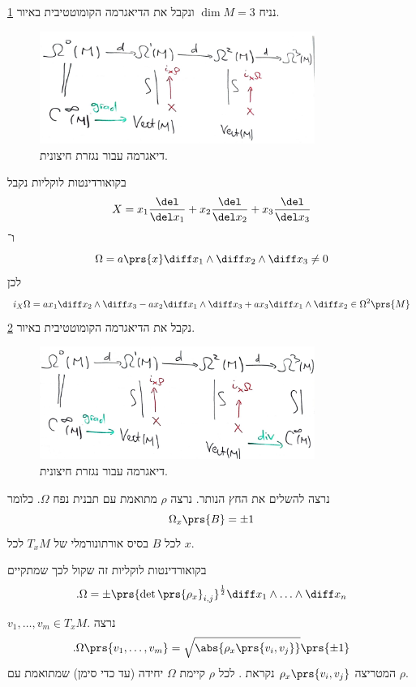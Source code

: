 \documentclass[a4paper,10pt,twoside,openany]{book}
\begin{document}
\begin{example}
נניח
$\dim M = 3$
ונקבל את הדיאגרמה הקומוטטיבית באיור
\ref{rot1}.

\begin{figure}[h!t]
\centering
\caption{דיאגרמה עבור נגזרת חיצונית.}
\label{rot1}
\includegraphics[width=0.8\textwidth]{sources/rot1}
\end{figure}

בקואורדינטות לוקליות נקבל
\[X = x_1 \frac{\del}{\del x_1} + x_2 \frac{\del}{\del x_2} + x_3 \frac{\del}{\del x_3}\]
ו־%
\[\Omega = a\prs{x} \diff x_1 \wedge \diff x_2 \wedge \diff x_3 \neq 0\]
לכן
\begin{align*}
i_X \Omega = a x_1 \diff x_2 \wedge \diff x_3 - ax_2 \diff x_1 \wedge \diff x_3 + a x_3 \diff x_1 \wedge \diff x_2 \in \Omega^2\prs{M}
\end{align*}
נקבל את הדיאגרמה הקומוטטיבית באיור
\ref{rot2}.
\begin{figure}[h!t]
\centering
\caption{דיאגרמה עבור נגזרת חיצונית.}
\label{rot2}
\includegraphics[width=0.8\textwidth]{sources/rot2}
\end{figure}
נרצה להשלים את החץ הנותר.
נרצה
$\rho$
מתואמת עם תבנית נפח
$\Omega$.
כלומר
\[\Omega_x\prs{B} = \pm 1\]
לכל
$B$
בסיס אורתונורמלי של
$T_x M$
לכל
$x$.

בקואורדינטות לוקליות זה שקול לכך שמתקיים
\[\text{.}\Omega = \pm \prs{\det \prs{\rho_x}_{i,j}}^{\frac{1}{2}} \diff x_1 \wedge \ldots \wedge \diff x_n\]

\begin{exercise}
$v_1, \ldots, v_m \in T_x M$.
נרצה
\begin{align*}
\text{.}\Omega \prs{v_1, \ldots, v_m} = \sqrt{\abs{\rho_x\prs{v_i, v_j}}}\prs{\pm 1}
\end{align*}
המטריצה
$\rho_x\prs{v_i, v_j}$
נקראת
.
לכל
$\rho$
קיימת
$\Omega$
יחידה (עד כדי סימן) שמתואמת עם
$\rho$.
\end{exercise}


\end{example}
\end{document}
